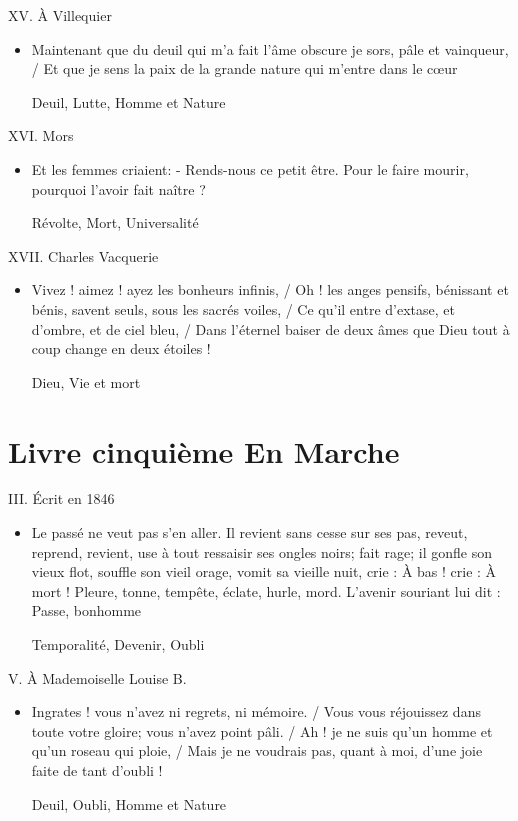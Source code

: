 \documentclass[french,a4paper,11pt,answers]{exam}
\newcommand{\cit}[2]{\og #1 \fg{} \begin{solution}{ #2 }\end{solution}} %
\begin{document}
	\begin{cadre}{XV. À Villequier}
		\begin{itemize}
			\item \cit{Maintenant que du deuil qui m'a fait l'âme obscure je sors, pâle et vainqueur, / Et que je sens la paix de la grande nature qui m'entre dans le c\oe{}ur}
				{Deuil, Lutte, Homme et Nature}
		\end{itemize}
	\end{cadre}
	
	\begin{cadre}{XVI. Mors}
		\begin{itemize}
			\item \cit{Et les femmes criaient: - Rends-nous ce petit être. Pour le faire mourir, pourquoi l'avoir fait naître ?}
				{Révolte, Mort, Universalité}
		\end{itemize}
	\end{cadre}
	
	\begin{cadre}{XVII. Charles Vacquerie}
		\begin{itemize}
			\item \cit{Vivez ! aimez ! ayez les bonheurs infinis, / Oh ! les anges pensifs, bénissant et bénis, savent seuls, sous les sacrés voiles, / Ce qu'il entre d'extase, et d'ombre, et de ciel bleu, / Dans l'éternel baiser de deux âmes que Dieu tout à coup change en deux étoiles !}
				{Dieu, Vie et mort}
		\end{itemize}
	\end{cadre}

	\section{Livre cinquième \og En Marche \fg}
	
	\begin{cadre}{III. Écrit en 1846}
		\begin{itemize}
			\item \cit{Le passé ne veut pas s'en aller. Il revient sans cesse sur ses pas, reveut, reprend, revient, use à tout ressaisir ses ongles noirs; fait rage; il gonfle son vieux flot, souffle son vieil orage, vomit sa vieille nuit, crie : À bas ! crie : À mort ! Pleure, tonne, tempête, éclate, hurle, mord. L'avenir souriant lui dit : Passe, bonhomme}
				{Temporalité, Devenir, Oubli}
		\end{itemize}
	\end{cadre}
	
	\begin{cadre}{V. À Mademoiselle Louise B.}
		\begin{itemize}
			\item \cit{Ingrates ! vous n'avez ni regrets, ni mémoire. / Vous vous réjouissez dans toute votre gloire; vous n'avez point pâli. / Ah ! je ne suis qu'un homme et qu'un roseau qui ploie, / Mais je ne voudrais pas, quant à moi, d'une joie faite de tant d'oubli !}
				{Deuil, Oubli, Homme et Nature}
		\end{itemize}
	\end{cadre}
	
\end{document}
